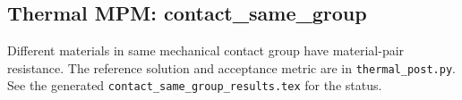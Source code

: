 \subsection{Thermal MPM: contact\_same\_group}
Different materials in same mechanical contact group have material-pair resistance. The reference solution and acceptance metric are in \texttt{thermal\_post.py}. See the generated \texttt{contact\_same\_group\_results.tex} for the status.
